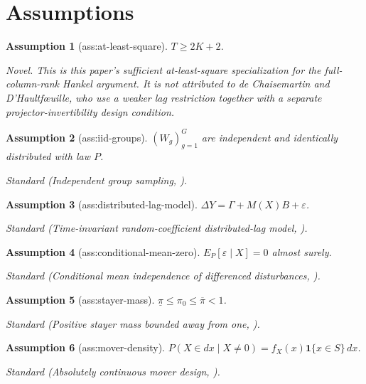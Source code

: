 \documentclass{article}
\newtheorem{assumption}{Assumption}
\begin{document}
\section{Assumptions}

\begin{assumption}[ass:at-least-square]\label{ass:at-least-square}
\(T\ge 2K+2\).
\par\smallskip\noindent\emph{Novel.} This is this paper's sufficient at-least-square specialization for the full-column-rank Hankel argument. It is not attributed to de Chaisemartin and D'Haultf\oe{}uille, who use a weaker lag restriction together with a separate projector-invertibility design condition.
\end{assumption}

\begin{assumption}[ass:iid-groups]\label{ass:iid-groups}
\((W_g)_{g=1}^G\) are independent and identically distributed with law \(P\).
\par\smallskip\noindent\emph{Standard} (Independent group sampling, \cite{GrahamPowell2012}).
\end{assumption}

\begin{assumption}[ass:distributed-lag-model]\label{ass:distributed-lag-model}
\(\Delta Y=\Gamma+M(X)B+\varepsilon\).
\par\smallskip\noindent\emph{Standard} (Time-invariant random-coefficient distributed-lag model, \cite{deChaisemartinDHa2025}).
\end{assumption}

\begin{assumption}[ass:conditional-mean-zero]\label{ass:conditional-mean-zero}
\(E_P[\varepsilon\mid X]=0\) almost surely.
\par\smallskip\noindent\emph{Standard} (Conditional mean independence of differenced disturbances, \cite{deChaisemartinDHa2025}).
\end{assumption}

\begin{assumption}[ass:stayer-mass]\label{ass:stayer-mass}
\(\underline\pi\le\pi_0\le\overline\pi<1\).
\par\smallskip\noindent\emph{Standard} (Positive stayer mass bounded away from one, \cite{SasakiUra2026}).
\end{assumption}

\begin{assumption}[ass:mover-density]\label{ass:mover-density}
\(P(X\in dx\mid X\ne0)=f_X(x)\mathbf 1\{x\in S\}\,dx\).
\par\smallskip\noindent\emph{Standard} (Absolutely continuous mover design, \cite{GrahamPowell2012}).
\end{assumption}
\end{document}
